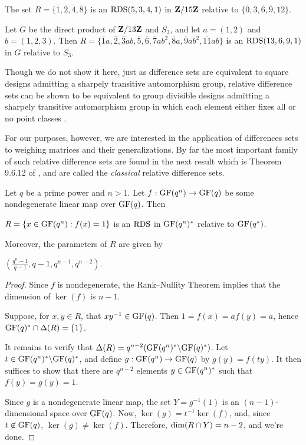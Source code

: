 \documentclass[../../../main]{subfiles}
\begin{document}
 \begin{ex}
  The set $R=\{\bar{1},\bar{2},\bar{4},\bar{8}\}$ is an $\text{RDS}(5,3,4,1)$ in $\mathbf{Z}/15\mathbf{Z}$ relative to $\{\bar{0},\bar{3},\bar{6},\bar{9},\bar{12}\}$.
 \end{ex}
 
 \begin{ex}
  Let $G$ be the direct product of $\mathbf{Z}/13\mathbf{Z}$ and $S_3$, and let $a=(1,2)$ and $b=(1,2,3)$. Then $R=\{\bar{1}a,\bar{2},\bar{3}ab,\bar{5},\bar{6},\bar{7}ab^2,\bar{8}a,\bar{9}ab^2,\bar{11}ab\}$ is an $\text{RDS}(13,6,9,1)$ in $G$ relative to $S_3$.
 \end{ex}
 
 Though we do not show it here, just as difference sets are equivalent to square designs admitting a sharpely transitive automorphism group, relative difference sets can be shown to be equivalent to group divisible designs admitting a sharpely transitive automorphism group in which each element either fixes all or no point classes \cite[see][]{gdd-singer}. 
 
 For our purposes, however, we are interested in the application of differences sets to weighing matrices and their generalizations. By far the most important family of such relative difference sets are found in the next result which is Theorem 9.6.12 of \cite{combinatorics-of-symmetric-designs}, and are called the {\it classical} relative difference sets.
 
 \begin{prop}
  Let $q$ be a prime power and $n>1$. Let $f : \text{GF}(q^n) \rightarrow \text{GF}(q)$ be some nondegenerate linear map over $\text{GF}(q)$. Then
  \begin{defenum}
  \item\label{aff-diff} $R=\{x \in \text{GF}(q^n) : f(x)=1\}$ is an $\text{RDS}$ in $\text{GF}(q^n)^*$ relative to $\text{GF}(q^*)$.
  \end{defenum}
  Moreover, the parameters of $R$ are given by
  \begin{defenum}[resume]
   \item\label{aff-diff-parameters} $\left( \frac{q^n-1}{q-1},q-1,q^{n-1},q^{n-2} \right)$.
  \end{defenum}
 \end{prop}
 
 \begin{proof}
  Since $f$ is nondegenerate, the Rank--Nullity Theorem implies that the dimension of $\ker(f)$ is $n-1$. 
  
  Suppose, for $x,y \in R$, that $xy^{-1} \in \text{GF}(q)$. Then $1=f(x)=af(y)=a$, hence $\text{GF}(q)^* \cap \Delta(R)=\{1\}$. 
  
  It remains to verify that $\Delta(R)=q^{n-2}(\text{GF}(q^n)^*\backslash\text{GF}(q)^*)$. Let $t \in \text{GF}(q^n)^*\backslash\text{GF}(q)^*$, and define $g : \text{GF}(q^n) \rightarrow \text{GF}(q)$ by $g(y)=f(ty)$. It then suffices to show that there are $q^{n-2}$ elements $y \in \text{GF}(q^n)^*$ such that $f(y)=g(y)=1$.
  
  Since $g$ is a nondegenerate linear map, the set $Y=g^{-1}(1)$ is an $(n-1)$-dimensional space over $\text{GF}(q)$. Now, $\ker(g)=t^{-1}\ker(f)$, and, since $t \not\in \text{GF}(q)$, $\ker(g) \neq \ker(f)$. Therefore, $\text{dim}(R \cap Y)=n-2$, and we're done.
 \end{proof}
 
\end{document}
